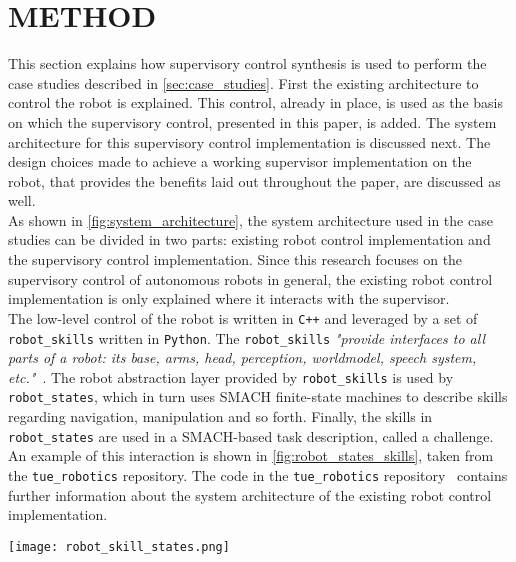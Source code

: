 \section{METHOD}\label{sec:method}
This section explains how supervisory control synthesis is used to perform the case studies described in \cref{sec:case_studies}.
First the existing architecture to control the robot is explained.
This control, already in place, is used as the basis on which the supervisory control, presented in this paper, is added.
The system architecture for this supervisory control implementation is discussed next.
The design choices made to achieve a working supervisor implementation on the robot, that provides the benefits laid out throughout the paper, are discussed as well.\\

As shown in \cref{fig:system_architecture}, the system architecture used in the case studies can be divided in two parts: existing robot control implementation and the supervisory control implementation.
Since this research focuses on the supervisory control of autonomous robots in general, the existing robot control implementation is only explained where it interacts with the supervisor.\\

The low-level control of the robot is written in \texttt{C++} and leveraged by a set of \texttt{robot\_skills} written in \texttt{Python}.
The \texttt{robot\_skills} \textit{"provide interfaces to all parts of a robot: its base, arms, head, perception, worldmodel, speech system, etc."}~\cite{amigo_github}.
The robot abstraction layer provided by \texttt{robot\_skills} is used by \texttt{robot\_states}, which in turn uses SMACH finite-state machines to describe skills regarding navigation, manipulation and so forth.
Finally, the skills in \texttt{robot\_states} are used in a SMACH-based task description, called a challenge.
An example of this interaction is shown in \cref{fig:robot_states_skills}, taken from the \texttt{tue\_robotics} repository.
The code in the \texttt{tue\_robotics} repository~\cite{amigo_github} contains further information about the system architecture of the existing robot control implementation.\\

\begin{figure*}
  \centering
  \texttt{[image: robot\_skill\_states.png]}
  \caption{Example interaction robot layers}\label{fig:robot_states_skills}
\end{figure*}


